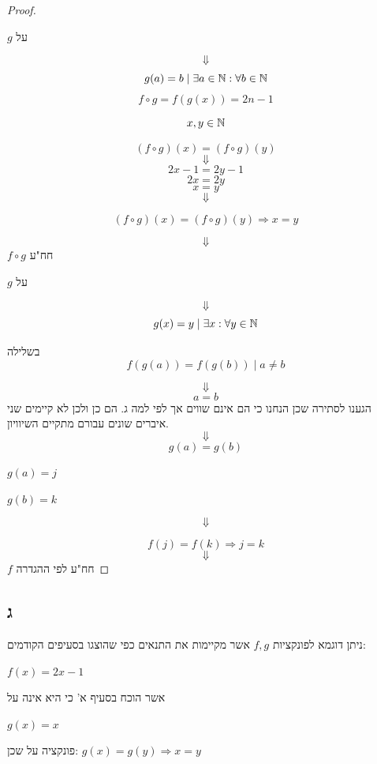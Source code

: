\documentclass{article}
\begin{document}
\begin{proof}
\begin{remark}
    $g$ על
\end{remark}
\[\Downarrow\]
\[
    g(a) = b \; | \; \exists a \in \Bbb{N} : \forall b \in \Bbb{N}
\]
\[
    f \circ g = f(g(x)) = 2n - 1
\]
\begin{letyehi}
    \[
        x, y \in \Bbb{N}
    \]
\end{letyehi}
\[
    (f \circ g)(x) = (f \circ g)(y)
\]
\[\Downarrow\]
\[
    2x - 1 = 2y - 1
\]
\[
    2x = 2y
\]
\[
    x = y
\]
\[\Downarrow\]
\begin{lem}
    \[ (f \circ g)(x) = (f \circ g)(y) \Rightarrow x = y \]
\end{lem}
\[\Downarrow\]
$ f \circ g $ חח"ע

\begin{remark}
    $g$ על
\end{remark}
\[\Downarrow\]
\[
    g(x) = y \; | \; \exists x : \forall y \in \Bbb{N} 
\]
\begin{ass}
    בשלילה
    \[f(g(a)) = f(g(b)) \; | \; a \not = b\]
\end{ass}
\[\Downarrow\]
\[
    a = b
\]
הגענו לסתירה שכן הנחנו כי הם אינם שווים אך לפי למה ג. הם כן ולכן לא קיימים שני איברים שונים עבורם מתקיים השיוויון.
\[\Downarrow\]
\[
    g(a) = g(b)
\]
\begin{letyehi}
    $ g(a) = j $
\end{letyehi}

\begin{letyehi}
    $ g(b) = k $
\end{letyehi}

\[\Downarrow\]

\[
    f(j) = f(k) \Rightarrow j = k
\]
\[\Downarrow\]
$f$ חח"ע לפי ההגדרה
\end{proof}

\newpage

\subsection*{ג}

ניתן דוגמא לפונקציות $f, g$
אשר מקיימות את התנאים כפי שהוצגו בסעיפים הקודמים:

\begin{ex}
    $ f(x) = 2x - 1 $
\end{ex}
אשר הוכח בסעיף א' כי היא אינה על

\begin{ex}
    $ g(x) = x $
\end{ex}
פונקציה על שכן: $ g(x) = g(y) \Rightarrow x = y $
\end{document}
